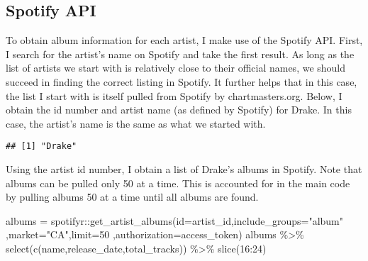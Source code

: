 \documentclass[
  11pt,
]{article}
\newenvironment{Shaded}{\begin{snugshade}}{\end{snugshade}}
\newcommand{\AttributeTok}[1]{\textcolor[rgb]{0.77,0.63,0.00}{#1}}
\newcommand{\DecValTok}[1]{\textcolor[rgb]{0.00,0.00,0.81}{#1}}
\newcommand{\FunctionTok}[1]{\textcolor[rgb]{0.00,0.00,0.00}{#1}}
\newcommand{\NormalTok}[1]{#1}
\newcommand{\OtherTok}[1]{\textcolor[rgb]{0.56,0.35,0.01}{#1}}
\newcommand{\SpecialCharTok}[1]{\textcolor[rgb]{0.00,0.00,0.00}{#1}}
\newcommand{\StringTok}[1]{\textcolor[rgb]{0.31,0.60,0.02}{#1}}
\begin{document}
\hypertarget{spotify-api}{%
\subsection{Spotify API}\label{spotify-api}}

To obtain album information for each artist, I make use of the Spotify
API. First, I search for the artist's name on Spotify and take the first
result. As long as the list of artists we start with is relatively close
to their official names, we should succeed in finding the correct
listing in Spotify. It further helps that in this case, the list I start
with is itself pulled from Spotify by chartmasters.org. Below, I obtain
the id number and artist name (as defined by Spotify) for Drake. In this
case, the artist's name is the same as what we started with.

\begin{Shaded}
\end{Shaded}

\begin{verbatim}
## [1] "Drake"
\end{verbatim}

Using the artist id number, I obtain a list of Drake's albums in
Spotify. Note that albums can be pulled only 50 at a time. This is
accounted for in the main code by pulling albums 50 at a time until all
albums are found.

\begin{Shaded}
\begin{Highlighting}[]
\NormalTok{albums }\OtherTok{=}\NormalTok{ spotifyr}\SpecialCharTok{::}\FunctionTok{get\_artist\_albums}\NormalTok{(}\AttributeTok{id=}\NormalTok{artist\_id,}\AttributeTok{include\_groups=}\StringTok{"album"}
\NormalTok{                                    ,}\AttributeTok{market=}\StringTok{"CA"}\NormalTok{,}\AttributeTok{limit=}\DecValTok{50}
\NormalTok{                                    ,}\AttributeTok{authorization=}\NormalTok{access\_token)}
\NormalTok{albums }\SpecialCharTok{\%\textgreater{}\%} 
  \FunctionTok{select}\NormalTok{(}\FunctionTok{c}\NormalTok{(name,release\_date,total\_tracks)) }\SpecialCharTok{\%\textgreater{}\%}
  \FunctionTok{slice}\NormalTok{(}\DecValTok{16}\SpecialCharTok{:}\DecValTok{24}\NormalTok{)}
\end{Highlighting}
\end{Shaded}
\end{document}
